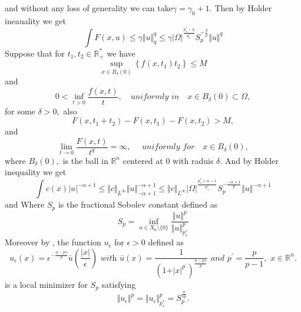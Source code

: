 \documentclass[10pt,twoside,reqno,centertags,draft]{amsart}
\begin{document}
and without any loss of generality we can take$ \gamma = \gamma_0 +1.$ Then by Holder ineauality we get
\begin{equation}\label{e1}
\int F(x,u) \leq \gamma \Vert u \Vert_{q}^{q} \leq \gamma \vert \Omega \vert^{\frac{p_s^*-q}{p_s^*}}S_{p}^{-\frac{q}{p}} \Vert u \Vert^{q}
\end{equation}
Suppose that for $ t_1, t_2 \in \mathbb{R}^*_+$  we have 
\begin{equation}\label{fd}
\sup_{x \in B_{\delta}(0)}\left\lbrace f(x,t_1)t_2\right\rbrace \leq M 
\end{equation} 
and
\begin{equation}\label{fd2}
0 <\inf_{t >0}\frac{f(x,t)}{t}, \quad \textit{uniformly in} \quad x \in B_{\delta}(0) \subset \Omega,
\end{equation}
for some $ \delta >0,$ also 
\begin{equation}\label{Fd}
F(x, t_1 +t_2) -F(x, t_1) -F(x, t_2) > M,
\end{equation}
and 
\begin{equation}\label{fd1}
\lim_{t \to 0}\frac{F(x,t)}{t^{q}} =\infty, \quad \textit{ uniformly for}  \quad x \in B_{\delta}(0),
\end{equation}
where $ B_{\delta}(0),$ is the ball in $ \mathbb{R}^{n}$ centered at $ 0$ with raduis $ \delta.$ And by Holder inequality we get
\begin{equation}\label{e2}
\int c(x)\vert u\vert^{-\alpha+1} \leq \Vert c \Vert_{L^{\infty}} \Vert u \Vert_{-\alpha +1}^{-\alpha +1} \leq \Vert c \Vert_{L^{\infty}}
\vert \Omega\vert^{\frac{p_s^* +\alpha -1}{p_s^*}}S_{p}^{-\frac{-\alpha+1}{p}} \Vert u \Vert^{-\alpha+1}
\end{equation}
and 
Where $ S_{p}$ is the fractional Sobolev constant defined as
\begin{equation}\label{e3}
S_{p} =\inf_{u \in X_0\setminus \{ 0\}}\frac{\Vert u\Vert^{p}}{\Vert u\Vert^{p}_{p_s^*}}
\end{equation}
Moreover by \cite{mosconi2016brezis},  the function $ u_{\epsilon}$ for $ \epsilon >0$ defined as
\begin{equation}\label{eee1}
u_{\epsilon}(x) =\epsilon^{-\frac{n -ps}{p}}\bar{u}(\frac{\vert x\vert}{\epsilon})\,\, \textit{with} \,\, \bar{u}(x) =\frac{1}{(1 +\vert x\vert^{p^{\prime}})^{\frac{n -ps}{p}}} \,\,\textit{and}\,\, p^{\prime} =\frac{p}{p -1}, \,\, x \in \mathbb{R}^n.
\end{equation}
is a local minimizer for $ S_{p}$ satisfying
\begin{equation}\label{eee2}
\Vert u_{\epsilon}\Vert^{p} =\Vert u_{\epsilon}\Vert_{p_s^*}^{p} =S_{p}^{\frac{n}{sp}}.
\end{equation}
\end{document}
